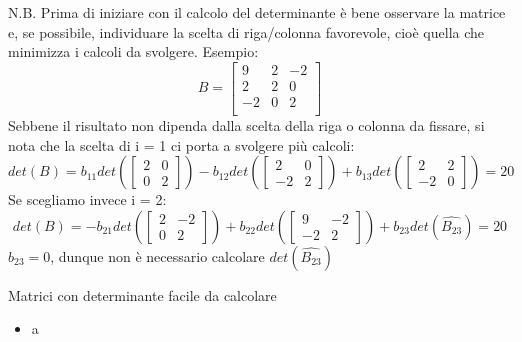 \documentclass[a4paper, 12pt]{article}
\theoremstyle{definition}
\begin{document}
\noindent N.B. Prima di iniziare con il calcolo del determinante è bene osservare la matrice e, se possibile, individuare la scelta di riga/colonna favorevole, cioè quella che minimizza i calcoli da svolgere. \break
Esempio:
\[
    B = \begin{bmatrix}
        9 & 2 & -2 \\
        2 & 2 & 0 \\
        -2 & 0 & 2 \\
    \end{bmatrix}
\]
Sebbene il risultato non dipenda dalla scelta della riga o colonna da fissare, si nota che la scelta di i = 1 ci porta a svolgere più calcoli:
\[ 
    det(B) = b_{11}det(\begin{bmatrix} 2 & 0 \\ 0 & 2 \end{bmatrix}) - b_{12}det(\begin{bmatrix} 2 & 0 \\ -2 & 2 \end{bmatrix}) + b_{13}det(\begin{bmatrix} 2 & 2 \\ -2 & 0 \end{bmatrix}) = 20
\]
Se scegliamo invece i = 2:
\[ 
    det(B) = -b_{21}det(\begin{bmatrix} 2 & -2 \\ 0 & 2 \end{bmatrix}) + b_{22}det(\begin{bmatrix} 9 & -2 \\ -2 & 2 \end{bmatrix}) + b_{23}det(\hat{B_{23}}) = 20
\]
$b_{23} = 0$, dunque non è necessario calcolare $det(\hat{B_{23}})$

\vspace{1cm}
\begin{center}
    Matrici con determinante facile da calcolare
\end{center}
\begin{itemize}
    \item a
    
\end{itemize}
\end{document}
